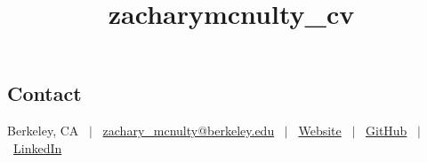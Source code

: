 \documentclass[margin,line,pifont,palatino,courier]{res}
\begin{document}
\title{zacharymcnulty_cv}
\begin{resume}

\section{\sc Contact}

\vspace{.02in}
Berkeley, CA \ $|$ \ \href{mailto:zachary_mcnulty@berkeley.edu}{zachary\_mcnulty@berkeley.edu} \ $|$ \ \href{https://math.berkeley.edu/~zmcnulty/}{Website} \ $|$ \ \href{https://github.com/zackmcnulty}{GitHub} \ $|$ \ \href{https://www.linkedin.com/in/zacharymcnulty/}{LinkedIn}


%




\end{resume}
\end{document}
